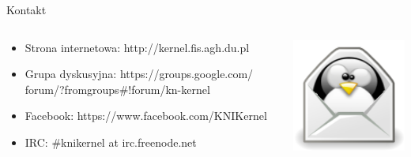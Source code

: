 \documentclass{beamer}
\begin{document}
\begin{frame}{Kontakt}
	\begin{minipage}[0.2\textheight]{\textwidth}
	\begin{columns}[T]
	\begin{column}{0.5\textwidth}
	\begin{itemize}
	\item Strona internetowa: http://kernel.fis.agh.du.pl
	\item Grupa dyskusyjna: https://groups.google.com/ forum/?fromgroups\#!forum/kn-kernel
	\item Facebook: https://www.facebook.com/KNIKernel
	\item IRC: \#knikernel at irc.freenode.net
	\end{itemize}
	\end{column}
	\begin{column}{0.4\textwidth}
	\hspace{5cm}
	\vspace{0.5cm}
	\includegraphics[width=6cm]{tuxbymail.png}\\
	\end{column}
	\end{columns}

	\end{minipage}

\end{frame}
\end{document}
